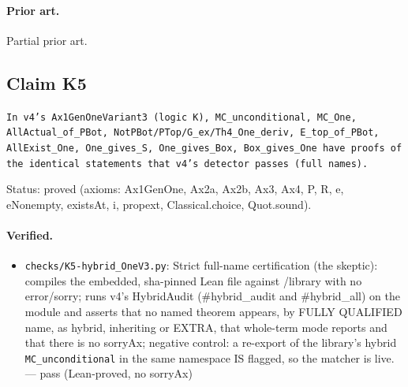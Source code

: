 \documentclass{article}
\begin{document}
\paragraph{Prior art.} Partial prior art.

\subsection*{Claim K5}

\texttt{In v4's Ax1GenOneVariant3 (logic K), MC\_unconditional, MC\_One, AllActual\_of\_PBot, NotPBot/PTop/G\_ex/Th4\_One\_deriv, E\_top\_of\_PBot, AllExist\_One, One\_gives\_S, One\_gives\_Box, Box\_gives\_One have proofs of the identical statements that v4's detector passes (full names).}

Status: proved (axioms: Ax1GenOne, Ax2a, Ax2b, Ax3, Ax4, P, R, e, eNonempty, existsAt, i, propext, Classical.choice, Quot.sound).

\paragraph{Verified.}
\begin{itemize}
\item \texttt{checks/K5-hybrid\_OneV3.py}: Strict full-name certification (the skeptic): compiles the embedded, sha-pinned Lean file against /library with no error/sorry; runs v4's HybridAudit (\#hybrid\_audit and \#hybrid\_all) on the module and asserts that no named theorem appears, by FULLY QUALIFIED name, as hybrid, inheriting or EXTRA, that whole-term mode reports and that there is no sorryAx; negative control: a re-export of the library's hybrid \texttt{MC\_unconditional} in the same namespace IS flagged, so the matcher is live. --- pass (Lean-proved, no sorryAx)
\end{itemize}
\end{document}
